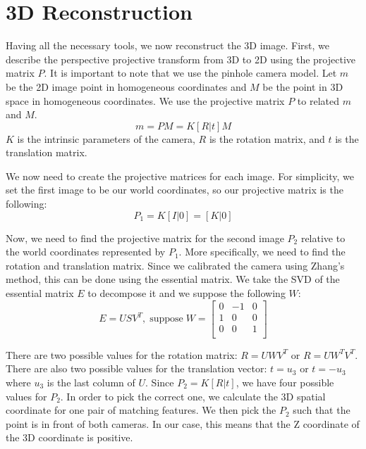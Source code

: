 \section{3D Reconstruction}
\label{s:reconstruction}
Having all the necessary tools, we now reconstruct the 3D image. First, we describe the perspective projective transform from 3D to 2D using the projective matrix $P$. It is important to note that we use the pinhole camera model. Let $m$ be the 2D image point in homogeneous coordinates and $M$ be the point in 3D space in homogeneous coordinates. We use the projective matrix $P$ to related $m$ and $M$.
\begin{equation}
m = PM = K[R | t]M
\end{equation}
$K$ is the intrinsic parameters of the camera, $R$ is the rotation matrix, and $t$ is the translation matrix.

We now need to create the projective matrices for each image. For simplicity, we set the first image to be our world coordinates, so our projective matrix is the following:
\begin{equation}
P_1 = K[I | 0] = [K | 0]
\end{equation}

Now, we need to find the projective matrix for the second image $P_2$ relative to the world coordinates represented by $P_1$. More specifically, we need to find the rotation and translation matrix. Since we calibrated the camera using Zhang's method, this can be done using the essential matrix. We take the SVD of the essential matrix $E$ to decompose it and we suppose the following $W$:
\begin{equation*}
E = USV^T, \; \text{suppose} \; W =
  \left[ {\begin{array}{ccc}
   0 & -1 & 0  \\
  1 & 0 & 0 \\
   0 & 0 & 1 \\
  \end{array} } \right]
\end{equation*}

There are two possible values for the rotation matrix: $R=UWV^T$ or $R=UW^TV^T$. There are also two possible values for the translation vector: $t = u_3$ or $t=-u_3$ where $u_3$ is the last column of $U$. Since $P_2 = K[R |t]$, we have four possible values for $P_2$. In order to pick the correct one, we calculate the 3D spatial coordinate for one pair of matching features. We then pick the $P_2$ such that the point is in front of both cameras. In our case, this means that the Z coordinate of the 3D coordinate is positive. 

